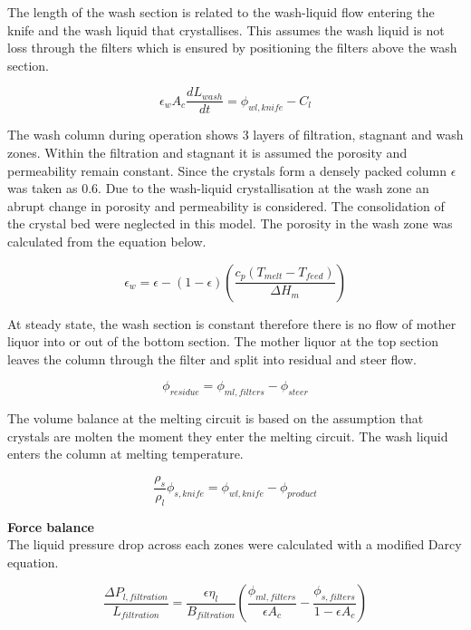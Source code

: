 The length of the wash section is related to the wash-liquid flow entering the knife and the wash liquid that crystallises. This assumes the wash liquid is not loss through the filters which is ensured by positioning the filters above the wash section.

\begin{equation}
\epsilon_w A_c \frac{dL_{wash}}{dt}= \phi_{wl,knife}-C_l
\end{equation}

The wash column during operation shows 3 layers of filtration, stagnant and wash zones. Within the filtration and stagnant it is assumed the porosity and permeability remain constant. Since the crystals form a densely packed column $\epsilon$ was taken as 0.6. Due to the wash-liquid crystallisation at the wash zone an abrupt change in porosity and permeability is considered. The consolidation of the crystal bed were neglected in this model. The porosity in the wash zone was calculated from the equation below. 

\begin{equation}
\epsilon_{w}= \epsilon-(1-\epsilon)\left(\frac{c_p(T_{melt}-T_{feed})}{\Delta H_m}\right)
\end{equation}

At steady state, the wash section is constant therefore there is no flow of mother liquor into or out of the bottom section. The mother liquor at the top section leaves the column through the filter and split into residual and steer flow. 

\begin{equation}
\phi_{residue}= \phi_{ml,filters} - \phi_{steer}
\end{equation}

The volume balance at the melting circuit is based on the assumption that crystals are molten the moment they enter the melting circuit. The wash liquid enters the column at melting temperature. 

\begin{equation}
\frac{\rho_s}{\rho_l}\phi_{s,knife}= \phi_{wl,knife} - \phi_{product}
\end{equation}


\textbf{Force balance}
\\The liquid pressure drop across each zones were calculated with a modified Darcy equation. 

\begin{equation}
\frac{\Delta P_{l,filtration}}{L_{filtration}}=\frac{\epsilon \eta_{l}}{B_{filtration}}\left(\frac{\phi_{ml,filters}}{\epsilon A_c} - \frac{\phi_{s,filters}}{1-\epsilon A_c}\right)
\end{equation}

